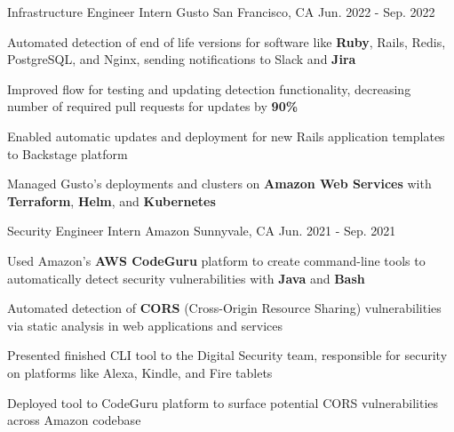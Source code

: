 

\begin{cventries}

\cventry
{Infrastructure Engineer Intern} %
{Gusto} %
{San Francisco, CA} %
{Jun. 2022 - Sep. 2022} %
{
  \begin{cvitems} %
    \item {Automated detection of end of life versions for software like \textbf{Ruby}, Rails, Redis, PostgreSQL, and Nginx, sending notifications to Slack and \textbf{Jira}}
    \item {Improved flow for testing and updating detection functionality, decreasing number of required pull requests for updates by \textbf{90\%}}
    \item {Enabled automatic updates and deployment for new Rails application templates to Backstage platform}
    \item {Managed Gusto's deployments and clusters on \textbf{Amazon Web Services} with \textbf{Terraform}, \textbf{Helm}, and \textbf{Kubernetes}}
  \end{cvitems}
}

\cventry
  {Security Engineer Intern} %
  {Amazon} %
  {Sunnyvale, CA} %
  {Jun. 2021 - Sep. 2021} %
  {
    \begin{cvitems} %
      \item {Used Amazon's \textbf{AWS CodeGuru} platform to create command-line tools to automatically detect security vulnerabilities with \textbf{Java} and \textbf{Bash}}
      \item {Automated detection of \textbf{CORS} (Cross-Origin Resource Sharing) vulnerabilities via static analysis in web applications and services}
      \item {Presented finished CLI tool to the Digital Security team, responsible for security on platforms like Alexa, Kindle, and Fire tablets}
      \item {Deployed tool to CodeGuru platform to surface potential CORS vulnerabilities across Amazon codebase}
    \end{cvitems}
  }


\end{cventries}
